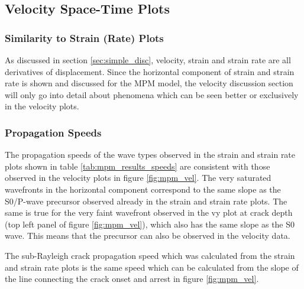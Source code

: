 \subsection{Velocity Space-Time Plots}
\label{{sec:mpm_vel_disc}}
\subsubsection{Similarity to Strain (Rate) Plots}
As discussed in section \ref{sec:simple_disc}, velocity, strain and strain rate are all derivatives of displacement. Since the horizontal component of strain and strain rate is shown and discussed for the MPM model, the velocity discussion section will only go into detail about phenomena which can be seen better or exclusively in the velocity plots. 

\subsubsection{Propagation Speeds}
The propagation speeds of the wave types observed in the strain and strain rate plots shown in table \ref{tab:mpm_results_speeds} are consistent with those observed in the velocity plots in figure \ref{fig:mpm_vel}. The very saturated wavefronts in the horizontal component correspond to the same slope as the S0/P-wave precursor observed already in the strain and strain rate plots. The same is true for the very faint wavefront observed in the vy plot at crack depth (top left panel of figure \ref{fig:mpm_vel}), which also has the same slope as the S0 wave. This means that the precursor can also be observed in the velocity data. \par

The sub-Rayleigh crack propagation speed which was calculated from the strain and strain rate plots is the same speed which can be calculated from the slope of the line connecting the crack onset and arrest in figure \ref{fig:mpm_vel}. \par 

